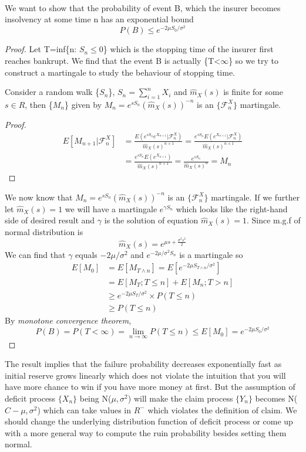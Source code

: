\documentclass[project2.tex]{subfiles}
\begin{document}
\paragraph{}
We want to show that the probability of event B, which the insurer becomes insolvency at some time n has an exponential bound
$$P(B)\leq e^{-2\mu S_0 / \sigma^2}$$
\begin{proof}
Let T=inf\{n: $S_n\leq0$\} which is the stopping time of the insurer first reaches bankrupt. We find that the event B is actually \{T<$\infty$\} so we try to construct a martingale to study the behaviour of stopping time.
\begin{theorem}
Consider a random walk \{$S_n$\}, $S_n=\sum_{i=1}^nX_i$ and  $\hat{m}_X(s)$ is finite for some $s\in R$, then  \{$M_n$\} given by $M_n=e^{sS_n}(\hat{m}_X(s))^{-n}$ is an $\{\mathcal{F}^X_n\}$ martingale.   
\end{theorem}
\begin{proof}
\begin{align*}
E[M_{n+1}|\mathcal{F}^X_n]&=\frac{E(e^{sS_n}e^{X_{n+1}}|\mathcal{F}^X_n)}{\hat{m}_X(s)^{n+1}}=\frac{e^{sS_n}E(e^{X_{n+1}}|\mathcal{F}^X_n)}{\hat{m}_X(s)^{n+1}}\\
&=\frac{e^{sS_n}E(e^{X_{n+1}})}{\hat{m}_X(s)^{n+1}}=\frac{e^{sS_n}}{\hat{m}_X(s)^{n}}=M_n
\end{align*}
\end{proof}
We now know that $M_n=e^{sS_n}(\hat{m}_X(s))^{-n}$ is an $\{\mathcal{F}^X_n\}$ martingale. If we further let $\hat{m}_X(s)=1$ we will have a martingale $e^{\gamma S_n}$ which looks like the right-hand side of desired result and $\gamma$ is the solution of equation $\hat{m}_X(s)=1$. Since m.g.f of normal distribution is $$\hat{m}_X(s)=e^{\mu s+\frac{\sigma^2 s^2}{2}}$$ We can find that $\gamma$ equals $-2\mu/\sigma^2$ and $e^{ -2\mu/\sigma^2 S_n}$ is a martingale so
\begin{align*}
E[M_0] &= E[M_{T\wedge n}] =E[e^{-2 \mu S_{T\wedge n}/  \sigma^2}]\\
&=E[M_T;T\leq n]+E[M_n;T>n]\\
&\geq e^{-2 \mu S_{T}/  \sigma^2} \times P(T\leq n)\\
&\geq P(T\leq n)
\end{align*}
By {\it monotone convergence theorem},
$$P(B)=P(T<\infty)=\lim_{n \to \infty} P(T\leq n)\leq E[M_0]=e^{ -2\mu S_0/\sigma^2 }$$
\end{proof}

The result implies that the failure probability decreases exponentially fast as initial reserve grows linearly which does not violate the intuition that you will have more chance to win if you have more money at first. But the assumption of deficit process $\{X_n\}$ being N($\mu,\sigma^2$) will make the claim process $\{Y_n\}$ becomes N($C-\mu,\sigma^2$) which can take values in $R^-$ which violates the definition of claim. We should change the underlying distribution function of deficit process or come up with a more general way to compute the ruin probability besides setting them normal. 
\end{document}
